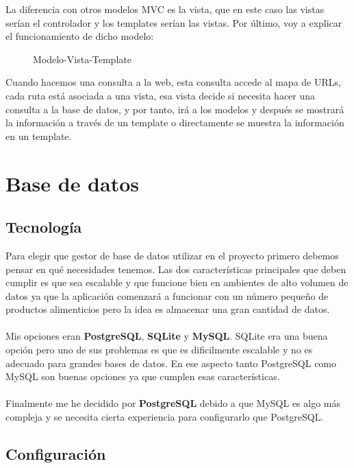 La diferencia con otros modelos MVC es la vista, que en este caso las vistas serían el controlador y los templates serían las vistas.
Por último, voy a explicar el funcionamiento de dicho modelo:

\begin{figure}[H]
  \centering
  \noindent{}
  \caption{Modelo-Vista-Template}
\end{figure}

Cuando hacemos una consulta a la web, esta consulta accede al mapa de URLs, cada ruta está asociada a una vista, 
esa vista decide si necesita hacer una consulta a la base de datos, y por tanto, irá a los modelos y después se 
mostrará la información a través de un template o directamente se muestra la información en un template.

\section{Base de datos}

\subsection{Tecnología}

Para elegir que gestor de base de datos utilizar en el proyecto primero debemos pensar en qué necesidades tenemos.
Las dos características principales que deben cumplir es que sea escalable y que funcione bien en ambientes de alto volumen 
de datos ya que la aplicación comenzará a funcionar con un número pequeño de productos alimenticios pero la idea es almacenar una gran cantidad de datos.\\ \\
Mis opciones eran \textbf{PostgreSQL}, \textbf{SQLite} y \textbf{MySQL}.
SQLite era una buena opción pero uno de sus problemas es que es dificilmente escalable y no es adecuado para grandes bases de datos.
En ese aspecto tanto PostgreSQL como MySQL son buenas opciones ya que cumplen esas características.\\ \\

Finalmente me he decidido por \textbf{PostgreSQL} debido a que MySQL es algo más compleja y se necesita cierta experiencia para configurarlo que PostgreSQL.

\subsection{Configuración}


